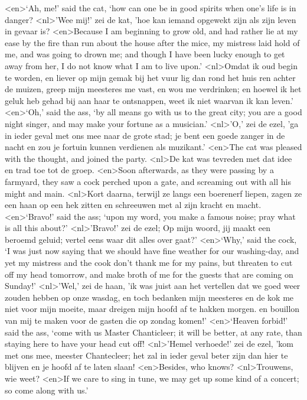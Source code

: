 <en>‘Ah, me!’ said the cat, ‘how can one be in good spirits when one’s life is in danger?
<nl>'Wee mij!' zei de kat, 'hoe kan iemand opgewekt zijn als zijn leven in gevaar is?
<en>Because I am beginning to grow old, and had rather lie at my ease by the fire than run about the house after the mice, my mistress laid hold of me, and was going to drown me; and though I have been lucky enough to get away from her, I do not know what I am to live upon.’
<nl>Omdat ik oud begin te worden, en liever op mijn gemak bij het vuur lig dan rond het huis ren achter de muizen, greep mijn meesteres me vast, en wou me verdrinken; en hoewel ik het geluk heb gehad bij aan haar te ontsnappen, weet ik niet waarvan ik kan leven.'
<en>‘Oh,’ said the ass, ‘by all means go with us to the great city; you are a good night singer, and may make your fortune as a musician.’
<nl>'O,' zei de ezel, 'ga in ieder geval met ons mee naar de grote stad; je bent een goede zanger in de nacht en zou je fortuin kunnen verdienen als muzikant.'
<en>The cat was pleased with the thought, and joined the party.
<nl>De kat was tevreden met dat idee en trad toe tot de groep.
<en>Soon afterwards, as they were passing by a farmyard, they saw a cock perched upon a gate, and screaming out with all his might and main.
<nl>Kort daarna, terwijl ze langs een boerenerf liepen, zagen ze een haan op een hek zitten en schreeuwen met al zijn kracht en macht.
<en>‘Bravo!’ said the ass; ‘upon my word, you make a famous noise; pray what is all this about?’
<nl>'Bravo!' zei de ezel; Op mijn woord, jij  maakt een beroemd geluid; vertel eens waar  dit alles over gaat?'
<en>‘Why,’ said the cock, ‘I was just now saying that we should have fine weather for our washing-day, and yet my mistress and the cook don’t thank me for my pains, but threaten to cut off my head tomorrow, and make broth of me for the guests that are coming on Sunday!’
<nl>'Wel,' zei de haan, 'ik was juist aan het vertellen dat we goed weer zouden hebben op onze wasdag, en toch bedanken mijn meesteres en de kok me niet voor mijn moeite, maar dreigen  mijn hoofd af te hakken morgen. en  bouillon van mij te maken voor de gasten die op zondag komen!'
<en>‘Heaven forbid!’ said the ass, ‘come with us Master Chanticleer; it will be better, at any rate, than staying here to have your head cut off!
<nl>'Hemel verhoede!' zei de ezel, 'kom met ons mee, meester Chantecleer; het zal in ieder geval beter zijn dan hier te blijven en  je hoofd af te laten slaan!
<en>Besides, who knows?
<nl>Trouwens, wie weet?
<en>If we care to sing in tune, we may get up some kind of a concert; so come along with us.’
